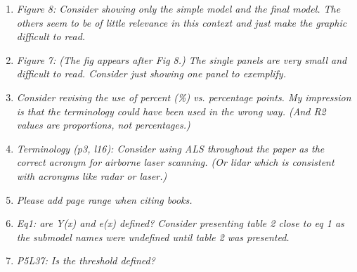 \documentclass{article}
\begin{document}
\begin{enumerate}
  
  \item \textit{Figure 8: Consider showing only the simple model and the final model. The others seem to be of little relevance in this context and just make the graphic difficult to read.}
  
    \answer{}
  
  
  \item \textit{Figure 7: (The fig appears after Fig 8.) The single panels are very small and difficult to read. Consider just showing one panel to exemplify.}
  
   \answer{}
  
  
  \item \textit{Consider revising the use of percent (\%) vs. percentage points. My impression is that the terminology could have been used in the wrong way. (And R2 values are proportions, not percentages.)}
  
     \answer{}
  
  
  \item \textit{Terminology (p3, l16): Consider using ALS throughout the paper as the correct acronym for airborne laser scanning. (Or lidar which is consistent with acronyms like radar or laser.)}
  
       \answer{}
  
  
  \item \textit{Please add page range when citing books.}
  
  \answer{}
  
  \item \textit{Eq1: are Y(x) and e(x) defined? Consider presenting table 2 close to eq 1 as the submodel names were undefined until table 2 was presented.}
  
    
  
  
  \item \textit{P5L37: Is the threshold defined?}
  
   \answer{}
  

\end{enumerate}
\end{document}
